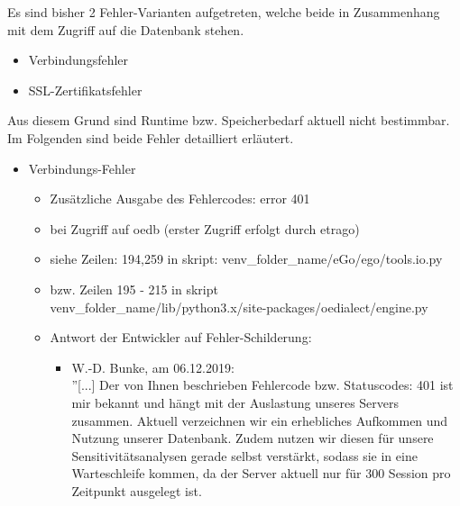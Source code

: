 \documentclass[
a4paper,     %
12pt         %
]{scrartcl}  %
\begin{document}
Es sind bisher 2 Fehler-Varianten aufgetreten, welche beide in Zusammenhang mit dem Zugriff auf die Datenbank stehen.
\begin{itemize}
	\item Verbindungsfehler
	\item SSL-Zertifikatsfehler
\end{itemize}
Aus diesem Grund sind Runtime bzw. Speicherbedarf aktuell nicht bestimmbar.\\

Im Folgenden sind beide Fehler detailliert erläutert.
\begin{itemize}
	\item Verbindungs-Fehler
	\begin{itemize}
		\begin{lstlisting}
		Traceback (most recent call last):
		File "/home/dafu-vm/ego_venv/lib/python3.6/site-packages/sqlalchemy/pool.py", line 1122, in _do_get
		return self._pool.get(wait, self._timeout)
		File "/home/dafu-vm/ego_venv/lib/python3.6/site-packages/sqlalchemy/util/queue.py", line 145, in get
		raise Empty
		sqlalchemy.util.queue.Empty

		During handling of the above exception, another exception occurred:
		Traceback (most recent call last):
		...
		...
		File "/home/dafu-vm/ego_venv/lib/python3.6/site-packages/oedialect/engine.py", line 213, in post
		raise ConnectionException(json_response['reason'] if 'reason' in json_response else 'No reason returned')
		oedialect.engine.ConnectionException: No reason returned

		\end{lstlisting}
		\item Zusätzliche Ausgabe des Fehlercodes: error 401
		\item[] bei Zugriff auf oedb (erster Zugriff erfolgt durch etrago)
		\item siehe Zeilen: 194,259 in skript: venv\_folder\_name/eGo/ego/tools.io.py
		\item[] bzw. Zeilen 195 - 215 in skript\\ venv\_folder\_name/lib/python3.x/site-packages/oedialect/engine.py
		\item Antwort der Entwickler auf Fehler-Schilderung:
		\begin{itemize}
			\item[]W.-D. Bunke, am 06.12.2019:\\''[...] Der von Ihnen beschrieben Fehlercode bzw. Statuscodes: 401 ist mir bekannt und hängt mit der Auslastung unseres Servers zusammen. Aktuell verzeichnen wir ein erhebliches Aufkommen und Nutzung unserer Datenbank. Zudem nutzen wir diesen für unsere Sensitivitätsanalysen gerade selbst verstärkt, sodass sie in eine Warteschleife kommen, da der Server aktuell nur für 300 Session pro Zeitpunkt ausgelegt ist.


\end{itemize}
\end{itemize}
\end{itemize}
\end{document}
